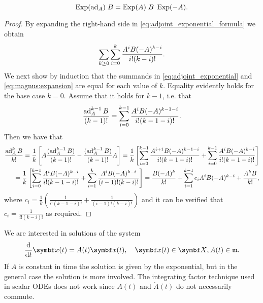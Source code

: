 \begin{lemma}
  \label{lemma:expadj}
  \begin{equation}
    \label{eq:adjoint_exponential_formula}
    \operatorname{Exp}(\operatorname{ad}_A) \; B = \operatorname{Exp}(A) \; B \; \operatorname{Exp}(-A).
  \end{equation}
\end{lemma}
\begin{proof}
  By expanding the right-hand side in \eqref{eq:adjoint_exponential_formula} we obtain
  \begin{equation}
    \label{eq:magnus:expansion}
    \sum_{k \geq 0} \sum_{i = 0}^{k} \frac{A^i B (-A)^{k-i}}{i! (k - i)!}.
  \end{equation}
  We next show by induction that the summands in \eqref{eq:adjoint_exponential} and \eqref{eq:magnus:expansion} are equal for each value of $k$. Equality evidently holds for the base case $k=0$. Assume that it holds for $k-1$, i.e. that
  \begin{equation}
    \frac{\operatorname{ad}_A^{k-1} B}{(k-1)!} = \sum_{i=0}^{k-1} \frac{A^i B (-A)^{k-1-i}}{i! (k-1-i)!}.
  \end{equation}
  Then we have that
  \begin{equation*}
    \begin{aligned}
      \frac{\operatorname{ad}_A^{k} B}{k!} = \frac{1}{k} \left[ A \frac{(\operatorname{ad}_A^{k-1} B)}{(k-1)!} - \frac{(\operatorname{ad}_A^{k-1} B)}{(k-1)!} A \right] =
      \frac{1}{k} \left[ \sum_{i=0}^{k-1} \frac{A^{i+1} B (-A)^{k-1-i}}{i! (k-1-i)!} + \sum_{i=0}^{k-1} \frac{A^i B (-A)^{k-i}}{i! (k-1-i)!} \right] \\
      = \frac{1}{k} \left[ \sum_{i=0}^{k-1} \frac{A^i B (-A)^{k-i}}{i! (k-1-i)!} +  \sum_{i=1}^{k} \frac{A^{i} B (-A)^{k-i}}{(i-1)! (k-i)!} \right] = \frac{B (-A)^k}{k!} + \sum_{i=1}^{k-1} c_i A^i B (-A)^{k-i} + \frac{A^k B}{k!},
    \end{aligned}
  \end{equation*}
  where $c_i = \frac{1}{k} \left( \frac{1}{i!(k-1-i)!} + \frac{1}{(i-1)!(k-i)!} \right)$ and it can be verified that $c_i = \frac{1}{i!(k-i)!}$ as required.
\end{proof}

We are interested in solutions of the system
\begin{equation}
  \label{eq:magnus_ode}
  \frac{\mathrm{d}}{\mathrm{d}t} \x(t) = \lx(t) \x(t), \quad \x(t) \in \X, A(t) \in \lX.
\end{equation}
If $A$ is constant in time the solution is given by the exponential, but in the general case the solution is more involved. The integrating factor technique used in scalar ODEs does not work since $A(t)$ and $\dot A(t)$ do not necessarily commute.


